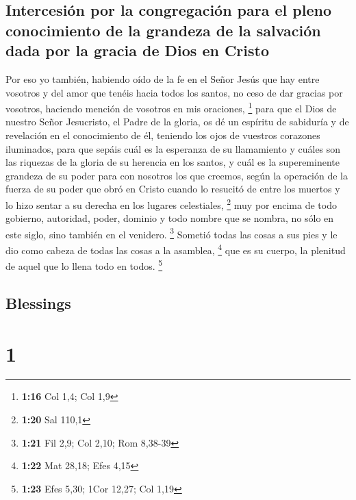 \begin{paracol}{2}
\hypertarget{intercesiuxf3n-por-la-congregaciuxf3n-para-el-pleno-conocimiento-de-la-grandeza-de-la-salvaciuxf3n-dada-por-la-gracia-de-dios-en-cristo}{%
\subsection{Intercesión por la congregación para el pleno conocimiento
de la grandeza de la salvación dada por la gracia de Dios en
Cristo}\label{intercesiuxf3n-por-la-congregaciuxf3n-para-el-pleno-conocimiento-de-la-grandeza-de-la-salvaciuxf3n-dada-por-la-gracia-de-dios-en-cristo}}

 Por eso yo también, habiendo oído de la fe en el Señor
Jesús que hay entre vosotros y del amor que tenéis hacia todos los
santos,  no ceso de dar gracias por vosotros, haciendo
mención de vosotros en mis oraciones, \footnote{\textbf{1:16} Col 1,4;
  Col 1,9}  para que el Dios de nuestro Señor Jesucristo,
el Padre de la gloria, os dé un espíritu de sabiduría y de revelación en
el conocimiento de él,  teniendo los ojos de vuestros
corazones iluminados, para que sepáis cuál es la esperanza de su
llamamiento y cuáles son las riquezas de la gloria de su herencia en los
santos,  y cuál es la supereminente grandeza de su poder
para con nosotros los que creemos, según la operación de la fuerza de su
poder  que obró en Cristo cuando lo resucitó de entre los
muertos y lo hizo sentar a su derecha en los lugares celestiales,
\footnote{\textbf{1:20} Sal 110,1}  muy por encima de
todo gobierno, autoridad, poder, dominio y todo nombre que se nombra, no
sólo en este siglo, sino también en el venidero. \footnote{\textbf{1:21}
  Fil 2,9; Col 2,10; Rom 8,38-39}  Sometió todas las
cosas a sus pies y le dio como cabeza de todas las cosas a la asamblea,
\footnote{\textbf{1:22} Mat 28,18; Efes 4,15}  que es su
cuerpo, la plenitud de aquel que lo llena todo en todos. \footnote{\textbf{1:23}
  Efes 5,30; 1Cor 12,27; Col 1,19}

\switchcolumn
\begin{otherlanguage}{english}

\hypertarget{blessings}{%
\subsection{Blessings}\label{blessings}}

\hypertarget{section-1}{%
\section{1}\label{section-1}}


\end{otherlanguage}
\end{paracol}
